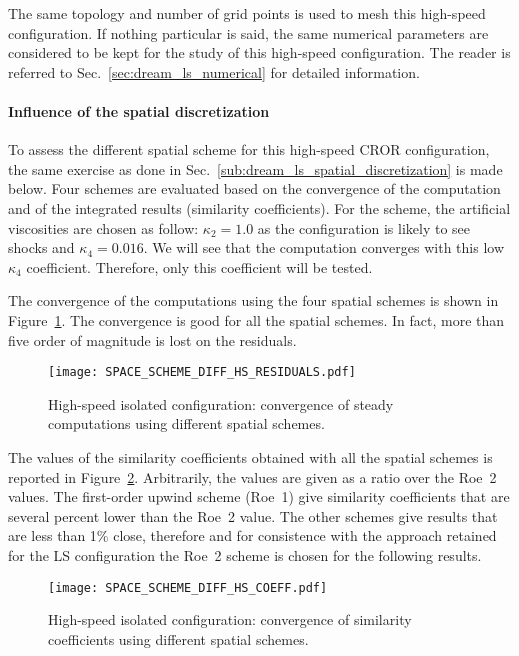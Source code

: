 
The same topology and number of grid points is used to
mesh this high-speed configuration. 
If nothing particular is said, the same numerical parameters
are considered to be kept for the study of this
high-speed configuration.
The reader is referred to 
Sec.~\ref{sec:dream_ls_numerical} for detailed information.

\paragraph{Influence of the spatial discretization}
\label{sub:dream_hs_spatial_discretization}

To assess the different spatial scheme for this high-speed
CROR configuration, the same exercise as done in 
Sec.~\ref{sub:dream_ls_spatial_discretization} is made below.
Four schemes are evaluated based 
on the convergence of the computation
and of the integrated 
results (similarity coefficients).
For the \citet{Jameson1981} scheme, the artificial viscosities
are chosen as follow: $\kappa_2 = 1.0$ as the configuration is likely to 
see shocks and $\kappa_4 = 0.016$. We will see that the computation converges
with this low $\kappa_4$ coefficient. Therefore, only this coefficient
will be tested.

The convergence of the computations using the four spatial schemes
is shown in Figure~\ref{fig:DREAM_HS_RESIDUALS_PPT}. The convergence is good
for all the spatial schemes. In fact, more than five order of magnitude
is lost on the residuals.
\begin{figure}[htp]
  \centering
  \texttt{[image: SPACE\_SCHEME\_DIFF\_HS\_RESIDUALS.pdf]}
  \caption{High-speed isolated configuration: convergence 
  of steady computations using different spatial schemes.}
  \label{fig:DREAM_HS_RESIDUALS_PPT}
\end{figure}

The values of the similarity coefficients obtained with
all the spatial schemes is reported in 
Figure~\ref{fig:dream_hs_space_scheme_coeff}. Arbitrarily, the values are
given as a ratio over the Roe~2 values. The first-order
upwind scheme (Roe~1) give similarity coefficients that are
several percent lower than the Roe~2 value. The other schemes
give results that are less than 1\% close, therefore and for
consistence with the approach retained for the LS configuration
the Roe~2 scheme is chosen for the following results.
\begin{figure}[htp]
  \centering
  \texttt{[image: SPACE\_SCHEME\_DIFF\_HS\_COEFF.pdf]}
  \caption{High-speed isolated configuration: convergence of 
  similarity coefficients using different spatial schemes.}
  \label{fig:dream_hs_space_scheme_coeff}
\end{figure}

